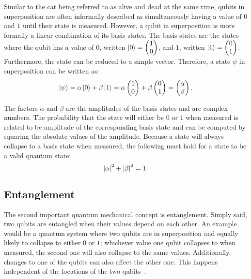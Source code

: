 Similar to the cat being referred to as alive and dead at the same time, qubits in superposition are often informally described as simultaneously having a value of $0$ and $1$ until their state is measured. However, a qubit in superposition is more formally a linear combination of its basis states. The basis states are the states where the qubit has a value of $0$, written $\ket{0} = \begin{pmatrix} 1 \\ 0 \end{pmatrix}$, and $1$, written $\ket{1} = \begin{pmatrix} 0 \\ 1 \end{pmatrix}$. Furthermore, the state can be reduced to a simple vector. Therefore, a state $\psi$ in superposition can be written as:
\begin{equation*}
    \ket{\psi} = \alpha \ket{0} + \beta \ket{1} = \alpha \begin{pmatrix} 1 \\ 0 \end{pmatrix} + \beta \begin{pmatrix} 0 \\ 1 \end{pmatrix} = \begin{pmatrix} \alpha \\ \beta \end{pmatrix}.
\end{equation*}

The factors $\alpha$ and $\beta$ are the amplitudes of the basis states and are complex numbers. The probability that the state will either be $0$ or $1$ when measured is related to be amplitude of the corresponding basis state and can be computed by squaring the absolute values of the amplitude. Because a state will always collapse to a basis state when measured, the following must hold for a state to be a valid quantum state:
\begin{equation*}
    \abs{\alpha}^2 + \abs{\beta}^2 = 1.
\end{equation*}

\subsection{Entanglement}
The second important quantum mechanical concept is entanglement. Simply said, two qubits are entangled when their values depend on each other. An example would be a quantum system where two qubits are in superposition and equally likely to collapse to either $0$ or $1$; whichever value one qubit collapses to when measured, the second one will also collapse to the same values. Additionally, changes to one of the qubits can also affect the other one. This happens independent of the locations of the two qubits~\cite{RDB*22, HHHH09}. 

